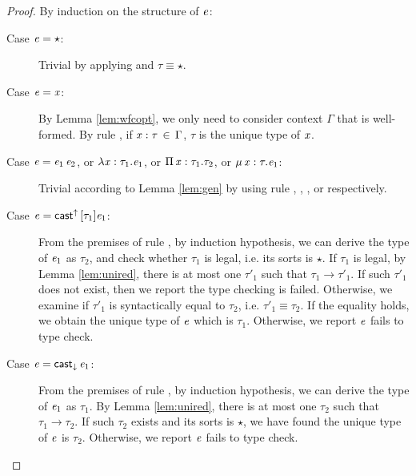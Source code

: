 \begin{proof}
	By induction on the structure of $\mathit{e}$:
	\begin{description}
	    \item[Case $\mathit{e}  =  \star$:] Trivial by applying  and $\tau  \equiv  \star$.
		\item[Case $\mathit{e}  =  \mathit{x}$:] By Lemma \ref{lem:wfcopt}, we only need to consider context $\Gamma$ that is well-formed. By rule , if $\mathit{x}  :  \tau \, \in \, \Gamma$, $\tau$ is the unique type of $\mathit{x}$.
		\item[Case $\mathit{e}=\mathit{e_{{\mathrm{1}}}} \, \mathit{e_{{\mathrm{2}}}}$, or $\lambda  \mathit{x}  :  \tau_{{\mathrm{1}}}  .  \mathit{e_{{\mathrm{1}}}}$, or $\Pi \, \mathit{x}  :  \tau_{{\mathrm{1}}}  .  \tau_{{\mathrm{2}}}$, or $\mu \, \mathit{x}  :  \tau  .  \mathit{e_{{\mathrm{1}}}}$:] Trivial according to Lemma \ref{lem:gen} by using rule , , , or  respectively.
		\item[Case $\mathit{e}=\mathsf{cast}^{\uparrow} \, [  \tau_{{\mathrm{1}}}  ]  \mathit{e_{{\mathrm{1}}}}$:] From the premises of rule , by induction hypothesis, we can derive the type of $\mathit{e_{{\mathrm{1}}}}$ as $\tau_{{\mathrm{2}}}$, and check whether $\tau_{{\mathrm{1}}}$ is legal, i.e. its sorts is $\star$. If $\tau_{{\mathrm{1}}}$ is legal, by Lemma \ref{lem:unired}, there is at most one $\tau'_{{\mathrm{1}}}$ such that $\tau_{{\mathrm{1}}}  \longrightarrow  \tau'_{{\mathrm{1}}}$. If such $\tau'_{{\mathrm{1}}}$ does not exist, then we report the type checking is failed. Otherwise, we examine if $\tau'_{{\mathrm{1}}}$ is syntactically equal to $\tau_{{\mathrm{2}}}$, i.e. $\tau'_{{\mathrm{1}}}  \equiv  \tau_{{\mathrm{2}}}$. If the equality holds, we obtain the unique type of $\mathit{e}$ which is $\tau_{{\mathrm{1}}}$. Otherwise, we report $\mathit{e}$ fails to type check.
		\item[Case $\mathit{e}=\mathsf{cast}_{\downarrow} \, \mathit{e_{{\mathrm{1}}}}$:] From the premises of rule , by induction hypothesis, we can derive the type of $\mathit{e_{{\mathrm{1}}}}$ as $\tau_{{\mathrm{1}}}$. By Lemma \ref{lem:unired}, there is at most one $\tau_{{\mathrm{2}}}$ such that $\tau_{{\mathrm{1}}}  \longrightarrow  \tau_{{\mathrm{2}}}$. If such $\tau_{{\mathrm{2}}}$ exists and its sorts is $\star$, we have found the unique type of $\mathit{e}$ is $\tau_{{\mathrm{2}}}$. Otherwise, we report $\mathit{e}$ fails to type check.
	\end{description}
\end{proof}

